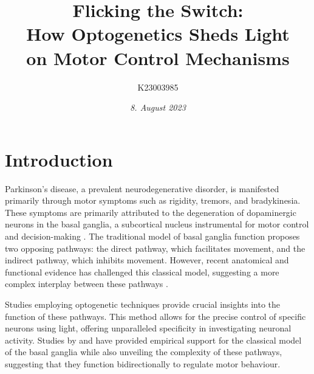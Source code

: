 \documentclass[10pt]{article}
\title{\textbf{Flicking the Switch: } \\ How Optogenetics Sheds Light \\ on Motor Control Mechanisms}
\author[ ]{K23003985}
\affil[ ]{\textbf{King’s College London}}
\date{\textit{8. August 2023}}
\begin{document}

\maketitle

\begin{sloppypar} %





  \doublespacing


  \section{Introduction}
  \label{sec:introduction}

  Parkinson’s disease, a prevalent neurodegenerative disorder, is manifested primarily through motor symptoms such as rigidity, tremors, and bradykinesia. These symptoms are primarily attributed to the degeneration of dopaminergic neurons in the basal ganglia, a subcortical nucleus instrumental for motor control and decision-making \citep{kravitz_regulation_2010}. The traditional model of basal ganglia function proposes two opposing pathways: the direct pathway, which facilitates movement, and the indirect pathway, which inhibits movement. However, recent anatomical and functional evidence has challenged this classical model, suggesting a more complex interplay between these pathways \citep{dunovan_believer-skeptic_2016}.

  Studies employing optogenetic techniques \citep{kravitz_regulation_2010, cui_concurrent_2013} provide crucial insights into the function of these pathways. This method allows for the precise control of specific neurons using light, offering unparalleled specificity in investigating neuronal activity. Studies by \cite{kravitz_regulation_2010} and \cite{cui_concurrent_2013} have provided empirical support for the classical model of the basal ganglia while also unveiling the complexity of these pathways, suggesting that they function bidirectionally \citep{yttri_opponent_2016} to regulate motor behaviour.


\end{sloppypar}
\end{document}
